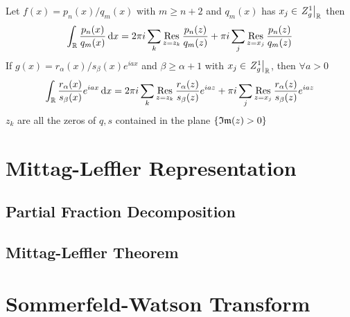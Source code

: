 \documentclass[../complete.tex]{subfiles}
\begin{document}
\begin{thm}
	Let $f(x)=p_n(x)/q_m(x)$ with $m\ge n+2$ and $q_m(x)$ has $x_j\in \left.Z_g^1\right|_{\mathbb{R}}$ then
	\begin{equation}
		\int_{\mathbb{R}}^{}\frac{p_n(x)}{q_m(x)}\operatorname{d\!} x=2\pi i\sum_k\operatorname*{\mathrm{Res}}_{z=z_k}\frac{p_n(z)}{q_m(z)}+\pi i\sum_j\operatorname*{\mathrm{Res}}_{z=x_j}\frac{p_n(z)}{q_m(z)}
		\label{eq:ratintsimple}
	\end{equation}
	If $g(x)=r_\alpha(x)/s_\beta(x)e^{iax}$ and $\beta\ge\alpha+1$ with $x_j\in\left.Z_g^1\right|_{\mathbb{R}}$, then $\forall a>0$
	\begin{equation}
		\int_{\mathbb{R}}^{}\frac{r_\alpha(x)}{s_\beta(x)}e^{iax}\operatorname{d\!} x=2\pi i\sum_k\operatorname*{\mathrm{Res}}_{z=z_k}\frac{r_\alpha(z)}{s_\beta(z)}e^{iaz}+\pi i\sum_j\operatorname*{\mathrm{Res}}_{z=x_j}\frac{r_\alpha(z)}{s_\beta(z)}e^{iaz}
		\label{eq:fourierratintsimp}
	\end{equation}
	$z_k$ are all the zeros of $q,s$ contained in the plane $\{\mathfrak{Im}(z)>0\}$
\end{thm}
\section{Mittag-Leffler Representation}
\subsection{Partial Fraction Decomposition}
\subsection{Mittag-Leffler Theorem}
\section{Sommerfeld-Watson Transform}
\end{document}
